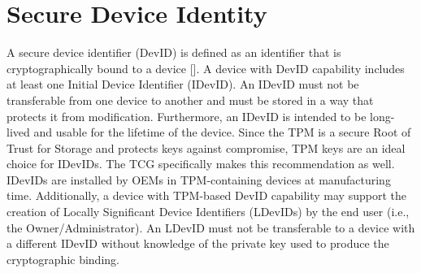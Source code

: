 \chapter{Secure Device Identity}


A secure device identifier (DevID) is defined as an identifier that is cryptographically bound to a device [\cite{DevIDSpec-IEEE}]. A device with DevID capability includes at least one Initial Device Identifier (IDevID). An IDevID must not be transferable from one device to another and must be stored in a way that protects it from modification. Furthermore, an IDevID is intended to be long-lived and usable for the lifetime of the device. Since the TPM is a secure Root of Trust for Storage and protects keys against compromise, TPM keys are an ideal choice for IDevIDs. The TCG specifically makes this recommendation as well. IDevIDs are installed by OEMs in TPM-containing devices at manufacturing time. Additionally, a device with TPM-based DevID capability may support the creation of Locally Significant Device Identifiers (LDevIDs) by the end user (i.e., the Owner/Administrator). An LDevID must not be transferable to a device with a different IDevID without knowledge of the private key used to produce the cryptographic binding. 



